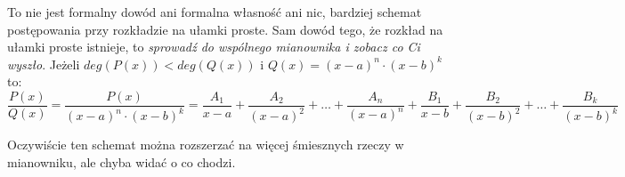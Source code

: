   To nie jest formalny dowód ani formalna własność ani nic, bardziej schemat postępowania przy rozkładzie na ułamki proste. Sam dowód tego, że rozkład na ułamki proste istnieje, to \textit{sprowadź do wspólnego mianownika i zobacz co Ci wyszło}.
  Jeżeli $deg(P(x)) < deg(Q(x))$ i $Q(x) = (x-a)^n \cdot (x-b)^k$ to:
  \begin{equation*}
            \frac{P(x)}{Q(x)} = \frac{P(x)}{(x-a)^n \cdot (x-b)^k} = \frac{A_1}{x-a} + \frac{A_2}{(x-a)^2} + \dots + \frac{A_n}{(x-a)^n} + \frac{B_1}{x-b} + \frac{B_2}{(x-b)^2} + \dots + \frac{B_k}{(x-b)^k}
  \end{equation*}

    Oczywiście ten schemat można rozszerzać na więcej śmiesznych rzeczy w mianowniku, ale chyba widać o co chodzi. 